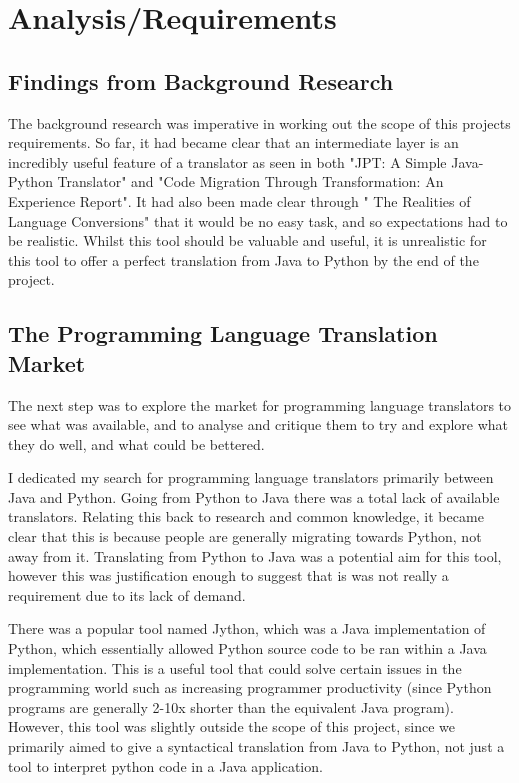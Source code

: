 \documentclass{l4proj}
\begin{document}
\chapter{Analysis/Requirements}

\section{Findings from Background Research}
The background research was imperative in working out the scope of this projects requirements. So far, it had became clear that an intermediate layer is an incredibly useful feature of a translator as seen in both "JPT: A Simple Java-Python Translator" and "Code Migration Through Transformation: An Experience Report". It had also been made clear through " The Realities of Language Conversions" that it would be no easy task, and so expectations had to be realistic. Whilst this tool should be valuable and useful, it is unrealistic for this tool to offer a perfect translation from Java to Python by the end of the project.

\section{The Programming Language Translation Market}
The next step was to explore the market for programming language translators to see what was available, and to analyse and critique them to try and explore what they do well, and what could be bettered.

I dedicated my search for programming language translators primarily between Java and Python. Going from Python to Java there was a total lack of available translators. Relating this back to research and common knowledge, it became clear that this is because people are generally migrating towards Python, not away from it. Translating from Python to Java was a potential aim for this tool, however this was justification enough to suggest that is was not really a requirement due to its lack of demand.

There was a popular tool named Jython, which was a Java implementation of Python, which essentially allowed Python source code to be ran within a Java implementation. This is a useful tool that could solve certain issues in the programming world such as increasing programmer productivity (since Python programs are generally 2-10x shorter than the equivalent Java program). However, this tool was slightly outside the scope of this project, since we primarily aimed to give a syntactical translation from Java to Python, not just a tool to interpret python code in a Java application. 
\end{document}
